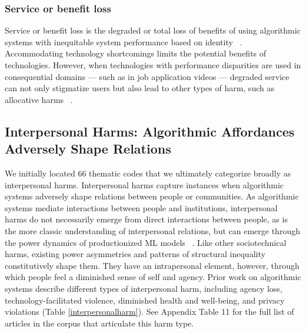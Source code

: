 \subsubsection{Service or benefit loss} Service or benefit loss is the degraded or total loss of benefits of using algorithmic systems with inequitable system performance based on identity ~\cite{mengesha2021don}. Accommodating technology shortcomings limits the potential benefits of technologies. However, when technologies with performance disparities are used in consequential domains — such as in job application videos — degraded service can not only stigmatize users but also lead to other types of harm, such as allocative harms ~\cite{Markl_2022}.

\begin{table}[t]
\centering
\setlength{\tabcolsep}{4.5pt}
\caption{Quality-of-Service harms}
\label{qosharms}
\end{table}

\subsection{Interpersonal Harms: Algorithmic Affordances Adversely Shape Relations}
We initially located 66 thematic codes that we ultimately categorize broadly as interpersonal harms.
Interpersonal harms capture instances when algorithmic systems adversely shape relations between people or communities. As algorithmic systems mediate interactions between people and institutions, interpersonal harms do not necessarily emerge from direct interactions between people, as is the more classic understanding of interpersonal relations, but can emerge through the power dynamics of productionized ML models ~\cite{Henry_Flynn_Powell_2020}. Like other sociotechnical harms, existing power asymmetries and patterns of structural inequality constitutively shape them. They have an intrapersonal element, however, through which people feel a diminished sense of self and agency. Prior work on algorithmic systems describe different types of interpersonal harm, including agency loss, technology-facilitated violence, diminished health and well-being, and privacy violations (Table \ref{interpersonalharm}). See Appendix Table 11 for the full list of articles in the corpus that articulate this harm type.

